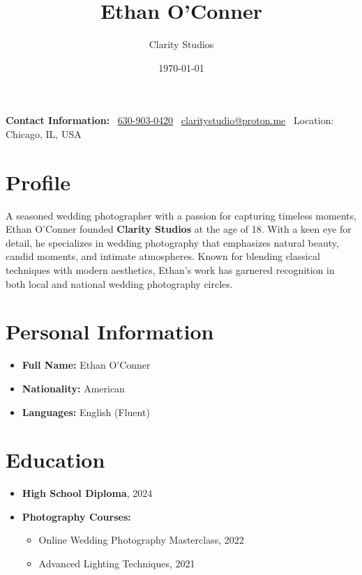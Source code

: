 \documentclass[12pt]{article}
\title{Ethan O'Conner}
\author{Clarity Studios}
\date{\today}
\begin{document}
\maketitle

\begin{center}
    \textbf{Contact Information:}
    \ \href{tel:+16309030420}{630-903-0420} \
    \href{mailto:claritystudio@proton.me}{claritystudio@proton.me} \
    Location: Chicago, IL, USA
\end{center}

\section{Profile}
A seasoned wedding photographer with a passion for capturing timeless moments, Ethan O'Conner founded \textbf{Clarity Studios} at the age of 18. With a keen eye for detail, he specializes in wedding photography that emphasizes natural beauty, candid moments, and intimate atmospheres. Known for blending classical techniques with modern aesthetics, Ethan's work has garnered recognition in both local and national wedding photography circles.

\section{Personal Information}
\begin{itemize}
    \item \textbf{Full Name:} Ethan O'Conner
    \item \textbf{Nationality:} American
    \item \textbf{Languages:} English (Fluent)
\end{itemize}

\section{Education}
\begin{itemize}
    \item \textbf{High School Diploma}, 2024
    \item \textbf{Photography Courses:} 
    \begin{itemize}
        \item Online Wedding Photography Masterclass, 2022
        \item Advanced Lighting Techniques, 2021
    \end{itemize}
\end{itemize}
\end{document}
